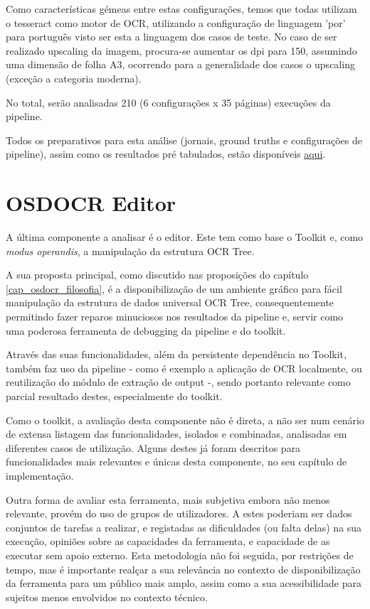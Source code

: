 Como características gémeas entre estas configurações, temos que todas utilizam o tesseract como motor de OCR, utilizando a configuração de linguagem 'por' para português visto ser esta a linguagem dos casos de teste. No caso de ser realizado upscaling da imagem, procura-se aumentar os dpi para 150, assumindo uma dimensão de folha A3, ocorrendo para a generalidade dos casos o upscaling (exceção a categoria moderna).

No total, serão analisadas 210 (6 configurações x 35 páginas) execuções da pipeline.



Todos os preparativos para esta análise (jornais, ground truths e configurações de pipeline), assim como os resultados pré tabulados, estão disponíveis \href{https://drive.google.com/drive/u/0/folders/1DW-AIuSxjEyv6ioq7jX8P1xruy03Sxo9}{aqui}.



\section{OSDOCR Editor}


A última componente a analisar é o editor. Este tem como base o Toolkit e, como \textit{modus operandis}, a manipulação da estrutura OCR Tree. 

A sua proposta principal, como discutido nas proposições do capítulo \ref{cap_osdocr_filosofia}, é a disponibilização de um ambiente gráfico para fácil manipulação da estrutura de dados universal OCR Tree, consequentemente permitindo fazer reparos minuciosos nos resultados da pipeline e, servir como uma poderosa ferramenta de debugging da pipeline e do toolkit.

Através das suas funcionalidades, além da persistente dependência no Toolkit, também faz uso da pipeline - como é exemplo a aplicação de OCR localmente, ou reutilização do módulo de extração de output -, sendo portanto relevante como parcial resultado destes, especialmente do toolkit.

Como o toolkit, a avaliação desta componente não é direta, a não ser num cenário de extensa listagem das funcionalidades, isolados e combinadas, analisadas em diferentes casos de utilização. Alguns destes já foram descritos para funcionalidades mais relevantes e únicas desta componente, no seu capítulo de implementação. 

Outra forma de avaliar esta ferramenta, mais subjetiva embora não menos relevante, provém do uso de grupos de utilizadores. A estes poderiam ser dados conjuntos de tarefas a realizar, e registadas as dificuldades (ou falta delas) na sua execução, opiniões sobre as capacidades da ferramenta, e capacidade de as executar sem apoio externo. Esta metodologia não foi seguida, por restrições de tempo, mas é importante realçar a sua relevância no contexto de disponibilização da ferramenta para um público mais amplo, assim como a sua acessibilidade para sujeitos menos envolvidos no contexto técnico.

